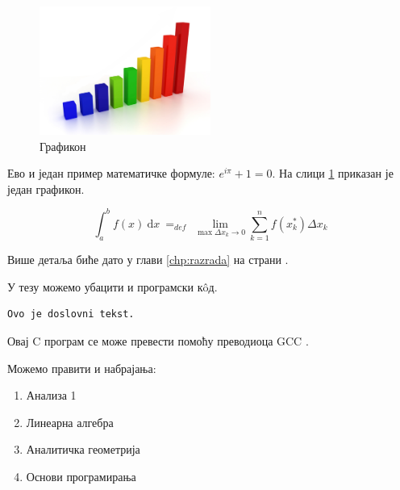 \documentclass[12pt,oneside]{memoir}
\begin{document}
\begin{figure}[!ht]
  \centering
  \includegraphics[width=0.5\textwidth]{graph.png}
  \caption{Графикон}
  \label{fig:grafikon}
\end{figure}

Ево и један пример математичке формуле: $e^{i\pi} + 1 = 0$. 
На слици \ref{fig:grafikon} приказан је један графикон.

$$
\int_a^b f(x)\ \mathrm{d}x \ =_{def}\ \lim_{\max{\Delta x_k \rightarrow 0}} \sum_{k=1}^n f(x_k^*)\Delta x_k
$$

Више детаља биће дато у глави \ref{chp:razrada} на страни \pageref{chp:razrada}.


У тезу можемо убацити и програмски кôд.

\begin{verbatim}
Ovo je doslovni tekst.
\end{verbatim}

%


Овај C програм се може превести помоћу преводиоца GCC \cite{gcc}.

Можемо правити и набрајања:
\begin{enumerate}
\item Анализа 1
\item Линеарна алгебра
\item Аналитичка геометрија
\item Основи програмирања
\end{enumerate}
\end{document}
